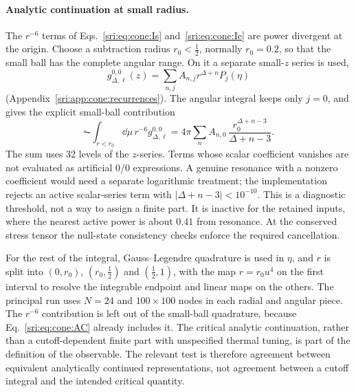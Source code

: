 \paragraph{Analytic continuation at small radius.} The $r^{-6}$ terms of Eqs.~\eqref{sri:eq:cone:Is}
and~\eqref{sri:eq:cone:Ie} are power divergent at the origin. Choose a subtraction radius $r_0<\frac12$, normally
$r_0=0.2$, so that the small ball has the complete angular range. On it a separate small-$z$ series is used,
\begin{equation}
 g_{\Delta,\ell}^{0,0}(z)=\sum_{n,j}A_{n,j}r^{\Delta+n}P_j(\eta)
\end{equation}
(Appendix~\ref{sri:app:cone:recurrences}). The angular integral keeps only $j=0$, and gives the explicit small-ball
contribution
\begin{equation}
 \AC\!\int_{r<r_0}\dd\mu\,r^{-6}g_{\Delta,\ell}^{0,0}=4\pi\sum_nA_{n,0}\,\frac{r_0^{\Delta+n-3}}{\Delta+n-3}.
 \label{sri:eq:cone:AC}
\end{equation}
The sum uses 32 levels of the $z$-series. Terms whose scalar coefficient vanishes are not evaluated as artificial
$0/0$ expressions. A genuine resonance with a nonzero coefficient would need a separate logarithmic treatment; the
implementation rejects an active scalar-series term with $|\Delta+n-3|<10^{-10}$. This is a diagnostic threshold, not a
way to assign a finite part. It is inactive for the retained inputs, where the nearest active power is about $0.41$
from resonance. At the conserved stress tensor the null-state consistency checks enforce the required cancellation.

For the rest of the integral, Gauss--Legendre quadrature is used in $\eta$, and $r$ is split into $(0,r_0)$,
$(r_0,\frac12)$ and $(\frac12,1)$, with the map $r=r_0u^4$ on the first interval to resolve the integrable endpoint and
linear maps on the others. The principal run uses $N=24$ and $100\times100$ nodes in each radial and angular piece. The
$r^{-6}$ contribution is left out of the small-ball quadrature, because Eq.~\eqref{sri:eq:cone:AC} already includes it. The
critical analytic continuation, rather than a cutoff-dependent finite part with unspecified thermal tuning, is part of
the definition of the observable. The relevant test is therefore agreement between equivalent analytically continued
representations, not agreement between a cutoff integral and the intended critical quantity.

